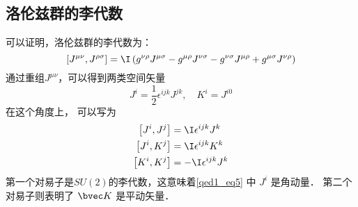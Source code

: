 \subsection{洛伦兹群的李代数}
可以证明，洛伦兹群的李代数为：
\begin{equation}\left[J^{\mu \nu}, J^{\rho \sigma}\right]=\I\left(g^{\nu \rho} J^{\mu \sigma}-g^{\mu \rho} J^{\nu \sigma}-g^{\nu \sigma} J^{\mu \rho}+g^{\mu \sigma} J^{\nu \rho}\right)\end{equation}
通过重组$J^{\mu\nu}$，可以得到两类空间矢量
\begin{equation}\label{qed1_eq5}J^{i}=\frac{1}{2} \epsilon^{i j k} J^{j k}, \quad K^{i}=J^{i 0}\end{equation}
在这个角度上， 可以写为
\begin{equation}\begin{aligned}
\left[J^{i}, J^{j}\right] &=\I \epsilon^{i j k} J^{k} \\
\left[J^{i}, K^{j}\right] &=\I \epsilon^{i j k} K^{k} \\
\left[K^{i}, K^{j}\right] &=-\I \epsilon^{i j k} J^{k}
\end{aligned}\end{equation}
第一个对易子是$SU(2)$的李代数，这意味着\autoref{qed1_eq5} 中 $J^i$ 是角动量． 第二个对易子则表明了 $\bvec K$ 是平动矢量．
